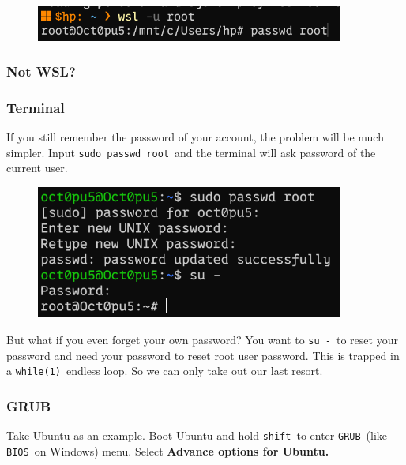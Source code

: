 \documentclass[12pt]{ctexart}
\begin{document}
\begin{figure}[H]
    \centering
    \includegraphics[width=0.9\textwidth,keepaspectratio]{assets/Linux/2.1 SHIT, I forgot my password again!/1.png}
\end{figure}

\subsubsection{\textbf{Not WSL?}}

\subsubsection*{\textbf{Terminal}}

If you still remember the password of your account, the problem will be
much simpler. Input \texttt{sudo\ passwd\ root}\ and the terminal will
ask password of the current user.

\begin{figure}[H]
    \centering
    \includegraphics[width=0.9\textwidth,keepaspectratio]{assets/Linux/2.1 SHIT, I forgot my password again!/2.png}
\end{figure}

But what if you even forget your own password? You want to
\texttt{su\ -}\ to reset your password and need your password to reset
root user password. This is trapped in a \texttt{while(1)}\ endless loop.
So we can only take out our last resort.

\subsubsection*{\textbf{GRUB}}

Take Ubuntu as an example. Boot Ubuntu and hold \texttt{shift}\ to enter
\texttt{GRUB}\ (like \texttt{BIOS}\ on Windows) menu. Select
\textbf{Advance options for Ubuntu.}
\end{document}

